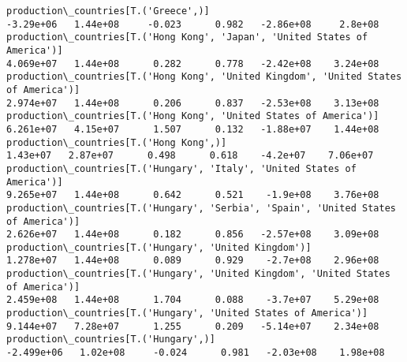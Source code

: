 \documentclass[11pt]{article}
\begin{document}
\begin{Verbatim}[commandchars=\\\{\}]
production\_countries[T.('Greece',)]                                                                                                                                                    -3.29e+06   1.44e+08     -0.023      0.982   -2.86e+08     2.8e+08
production\_countries[T.('Hong Kong', 'Japan', 'United States of America')]                                                                                                             4.069e+07   1.44e+08      0.282      0.778   -2.42e+08    3.24e+08
production\_countries[T.('Hong Kong', 'United Kingdom', 'United States of America')]                                                                                                    2.974e+07   1.44e+08      0.206      0.837   -2.53e+08    3.13e+08
production\_countries[T.('Hong Kong', 'United States of America')]                                                                                                                      6.261e+07   4.15e+07      1.507      0.132   -1.88e+07    1.44e+08
production\_countries[T.('Hong Kong',)]                                                                                                                                                  1.43e+07   2.87e+07      0.498      0.618    -4.2e+07    7.06e+07
production\_countries[T.('Hungary', 'Italy', 'United States of America')]                                                                                                               9.265e+07   1.44e+08      0.642      0.521    -1.9e+08    3.76e+08
production\_countries[T.('Hungary', 'Serbia', 'Spain', 'United States of America')]                                                                                                     2.626e+07   1.44e+08      0.182      0.856   -2.57e+08    3.09e+08
production\_countries[T.('Hungary', 'United Kingdom')]                                                                                                                                  1.278e+07   1.44e+08      0.089      0.929    -2.7e+08    2.96e+08
production\_countries[T.('Hungary', 'United Kingdom', 'United States of America')]                                                                                                      2.459e+08   1.44e+08      1.704      0.088    -3.7e+07    5.29e+08
production\_countries[T.('Hungary', 'United States of America')]                                                                                                                        9.144e+07   7.28e+07      1.255      0.209   -5.14e+07    2.34e+08
production\_countries[T.('Hungary',)]                                                                                                                                                  -2.499e+06   1.02e+08     -0.024      0.981   -2.03e+08    1.98e+08

\end{Verbatim}
\end{document}
